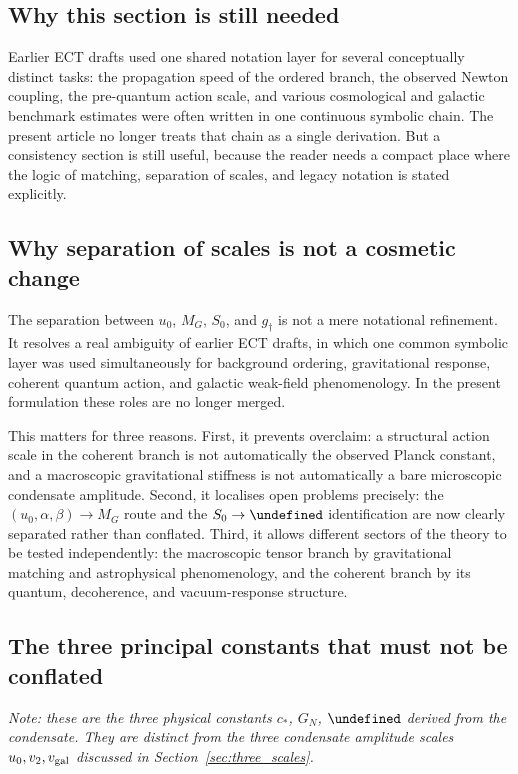 \documentclass[11pt,a4paper]{article}
\let\hbar\undefined
\numberwithin{equation}{section}
\begin{document}
\subsection*{Why this section is still needed}

Earlier ECT drafts used one shared notation layer for several
conceptually distinct tasks:
the propagation speed of the ordered branch,
the observed Newton coupling,
the pre-quantum action scale,
and various cosmological and galactic benchmark estimates were often
written in one continuous symbolic chain.
The present article no longer treats that chain as a single derivation.
But a consistency section is still useful, because the reader needs a
compact place where the logic of matching, separation of scales, and
legacy notation is stated explicitly.

\subsection*{Why separation of scales is not a cosmetic change}

The separation between $u_0$, $M_G$, $S_0$, and $g_\dagger$ is not a
mere notational refinement.
It resolves a real ambiguity of earlier ECT drafts, in which one common
symbolic layer was used simultaneously for background ordering,
gravitational response, coherent quantum action, and galactic weak-field
phenomenology.
In the present formulation these roles are no longer merged.

This matters for three reasons.
First, it prevents overclaim: a structural action scale in the coherent
branch is not automatically the observed Planck constant, and a
macroscopic gravitational stiffness is not automatically a bare
microscopic condensate amplitude.
Second, it localises open problems precisely:
the $(u_0,\alpha,\beta)\to M_G$ route and the $S_0\to\hbar$
identification are now clearly separated rather than conflated.
Third, it allows different sectors of the theory to be tested
independently:
the macroscopic tensor branch by gravitational matching and
astrophysical phenomenology, and the coherent branch by its quantum,
decoherence, and vacuum-response structure.

\subsection*{The three principal constants that must not be conflated}
\textit{Note: these are the three physical constants $c_*$, $G_N$, $\hbar$ derived from the
condensate. They are distinct from the three condensate amplitude scales
$u_0, v_2, v_{\rm gal}$ discussed in Section~\ref{sec:three_scales}.}
\end{document}
